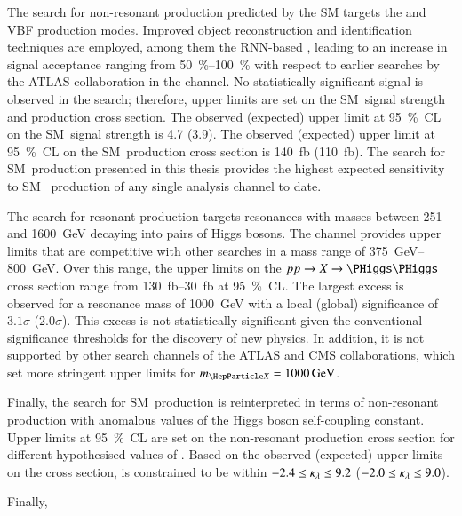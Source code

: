 The search for non-resonant \HH production predicted by the SM targets the \ggF
and VBF production modes. Improved object reconstruction and identification
techniques are employed, among them the RNN-based \tauid, leading to an increase
in signal acceptance ranging from \SIrange{50}{100}{\percent} with respect to
earlier searches by the ATLAS collaboration in the \bbtautau channel. No
statistically significant signal is observed in the search; therefore, upper
limits are set on the SM~\HH signal strength and production cross section. The
observed (expected) upper limit at \SI{95}{\percent}~CL on the SM~\HH signal
strength is 4.7 (3.9).  The observed (expected) upper limit at
\SI{95}{\percent}~CL on the SM~\HH production cross section is
\SI{140}{\femto\barn} (\SI{110}{\femto\barn}). The search for SM~\HH production
presented in this thesis provides the highest expected sensitivity to SM~\HH
production of any single analysis channel to date.


The search for resonant \HH production targets resonances with masses between
\num{251} and \SI{1600}{\GeV} decaying into pairs of Higgs bosons. The \bbtautau
channel provides upper limits that are competitive with other searches in a mass
range of \SIrange{375}{800}{\GeV}. Over this range, the upper limits on the
$pp \to X \to \HH$ cross section range from \SIrange{130}{30}{\femto\barn} at
\SI{95}{\percent}~CL. The largest excess is observed for a resonance mass of
\SI{1000}{\GeV} with a local (global) significance of $3.1\sigma$
($2.0\sigma$). This excess is not statistically significant given the
conventional significance thresholds for the discovery of new physics. In
addition, it is not supported by other search channels of the ATLAS and CMS
collaborations, which set more stringent upper limits for
$\mX = \SI{1000}{\GeV}$.


Finally, the search for SM~\HH production is reinterpreted in terms of
non-resonant \HH production with anomalous values of the Higgs boson
self-coupling constant. Upper limits at \SI{95}{\percent}~CL are set on the
non-resonant \HH production cross section for different hypothesised values of
\klambda. Based on the observed (expected) upper limits on the cross section,
\klambda is constrained to be within $-2.4 \leq \kappa_{\lambda} \leq 9.2$
($-2.0 \leq \kappa_{\lambda} \leq 9.0$).




Finally,



